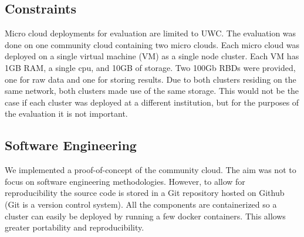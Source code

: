 \documentclass{sig-alternate-05-2015}
\begin{document}
\subsection{Constraints}
Micro cloud deployments for evaluation are limited to UWC. The evaluation was done on one community cloud containing two micro clouds. Each micro cloud was deployed on a single virtual machine (VM) as a single node cluster. Each VM has 1GB RAM, a single cpu, and 10GB of storage. Two 100Gb RBDs were provided, one for raw data and one for storing results. Due to both clusters residing on the same network, both clusters made use of the same storage. This would not be the case if each cluster was deployed at a different institution, but for the purposes of the evaluation it is not important.

\subsection{Software Engineering}

We implemented a proof-of-concept of the community cloud. The aim was not to focus on software engineering methodologies. However, to allow for reproducibility the source code is stored in a Git repository hosted on Github (Git is a version control system). All the components are containerized so a cluster can easily be deployed by running a few docker containers. This allows greater portability and reproducibility. 
\end{document}

